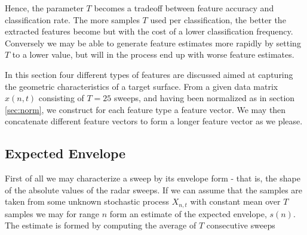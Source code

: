Hence, the parameter $T$ becomes a tradeoff between feature accuracy and classification rate. The more samples $T$ used per classification, the better the extracted features become but with the cost of a lower classification frequency. Conversely we may be able to generate feature estimates more rapidly by setting $T$ to a lower value, but will in the process end up with worse feature estimates. 


In this section four different types of features are discussed aimed at capturing the geometric characteristics of a target surface. From a given data matrix $x(n,t)$ consisting of $T=25$ sweeps, and having been normalized as in section \ref{sec:norm}, we construct for each feature type a feature vector. We may then concatenate different feature vectors to form a longer feature vector as we please.  




\subsection{Expected Envelope}

First of all we may characterize a sweep by its envelope form - that is, the shape of the absolute values of the radar sweeps. If we can assume that the samples are taken from some unknown stochastic process $X_{n,t}$ with constant mean over $T$ samples we may for range $n$ form an estimate of the expected envelope, $s(n)$. The estimate is formed by computing the average of $T$ consecutive sweeps

